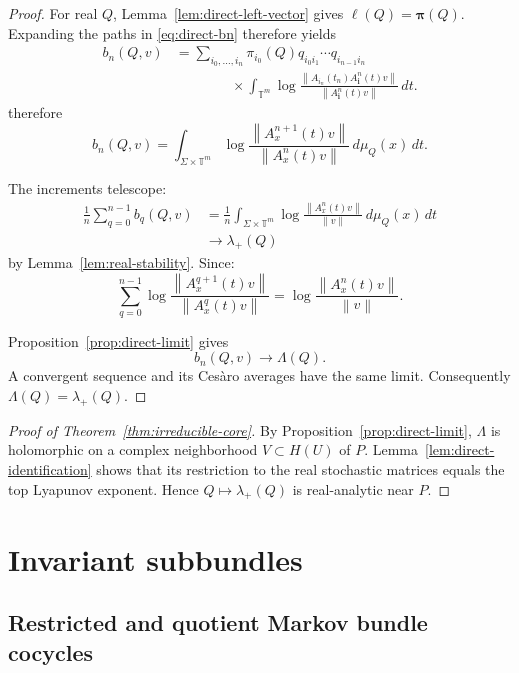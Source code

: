 \documentclass[11pt,a4paper]{amsart}
\newcommand{\T}{\mathbb T}
\newcommand{\norm}[1]{\left\lVert #1\right\rVert}
\begin{document}
\begin{proof}
For real \(Q\), Lemma~\ref{lem:direct-left-vector} gives
\(\boldsymbol\ell(Q)=\boldsymbol\pi(Q)\).  Expanding the paths in
\eqref{eq:direct-bn} therefore yields
\[
\begin{aligned}
 b_n(Q,v)
 &=
 \sum_{i_0,\ldots,i_n}
 \pi_{i_0}(Q)
 q_{i_0i_1}\cdots q_{i_{n-1}i_n}\\
 &\qquad\qquad\times
 \int_{\T^m}
 \log
 \frac{
 \norm{
 A_{i_n}(t_n)A_{\mathbf i}^n(t)v}}
 {\norm{A_{\mathbf i}^n(t)v}}
 \,dt.
\end{aligned}
\]
therefore 
\[
 b_n(Q,v)
 =
 \int_{\Sigma\times\T^m}
 \log
 \frac{\norm{A_x^{n+1}(t)v}}
      {\norm{A_x^n(t)v}}
 \,d\mu_Q(x)\,dt.
\]

The increments telescope:
\[
\begin{aligned}
 \frac1n\sum_{q=0}^{n-1}b_q(Q,v)
 &=
 \frac1n
 \int_{\Sigma\times\T^m}
 \log\frac{\norm{A_x^n(t)v}}{\norm v}
 \,d\mu_Q(x)\,dt\\
 &\longrightarrow\lambda_+(Q)
\end{aligned}
\]
by Lemma~\ref{lem:real-stability}.
Since:
\[
 \sum_{q=0}^{n-1}
 \log\frac{\norm{A_x^{q+1}(t)v}}
          {\norm{A_x^q(t)v}}
 =
 \log\frac{\norm{A_x^n(t)v}}{\norm v}.
\]

Proposition~\ref{prop:direct-limit} gives
\[
 b_n(Q,v)\longrightarrow\Lambda(Q).
\]
A convergent sequence and its Cesàro averages have the same limit.
Consequently \(\Lambda(Q)=\lambda_+(Q)\).
\end{proof}

\begin{proof}[Proof of Theorem~\ref{thm:irreducible-core}]
By Proposition~\ref{prop:direct-limit}, \(\Lambda\) is holomorphic on
a complex neighborhood \(V\subset H(U)\) of \(P\).
Lemma~\ref{lem:direct-identification} shows that its restriction to
the real stochastic matrices equals the top Lyapunov exponent.  Hence
\(Q\mapsto\lambda_+(Q)\) is real-analytic near \(P\).

\end{proof}

\section{Invariant subbundles}

\subsection{Restricted and quotient Markov bundle cocycles}
\end{document}
